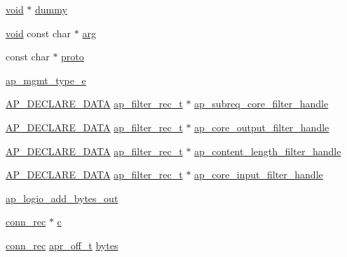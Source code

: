 \begin{DoxyCompactItemize}
\item 
\hyperlink{group__MOD__ISAPI_gacd6cdbf73df3d9eed42fa493d9b621a6}{void} $\ast$ \hyperlink{group__APACHE__CORE__HTTPD_ga99dc3b67257851cb91efea473083cd0f}{dummy}
\item 
\hyperlink{group__MOD__ISAPI_gacd6cdbf73df3d9eed42fa493d9b621a6}{void} const char $\ast$ \hyperlink{group__APACHE__CORE__HTTPD_gaf6517210150d97cd5cb8a17e3768770d}{arg}
\item 
const char $\ast$ \hyperlink{group__APACHE__CORE__HTTPD_ga1491042fd5b61bf39023b8df4c736128}{proto}
\item 
\hyperlink{group__APACHE__CORE__HTTPD_gaaf55dd27b182eda12b11c0694f78aae7}{ap\+\_\+mgmt\+\_\+type\+\_\+e}
\item 
\hyperlink{ap__config_8h_a0bb4c3adf74510a0dcdad5b125725fe0}{A\+P\+\_\+\+D\+E\+C\+L\+A\+R\+E\+\_\+\+D\+A\+TA} \hyperlink{structap__filter__rec__t}{ap\+\_\+filter\+\_\+rec\+\_\+t} $\ast$ \hyperlink{group__APACHE__CORE__HTTPD_ga3845515345618ae5adba5cf543a6ca60}{ap\+\_\+subreq\+\_\+core\+\_\+filter\+\_\+handle}
\item 
\hyperlink{ap__config_8h_a0bb4c3adf74510a0dcdad5b125725fe0}{A\+P\+\_\+\+D\+E\+C\+L\+A\+R\+E\+\_\+\+D\+A\+TA} \hyperlink{structap__filter__rec__t}{ap\+\_\+filter\+\_\+rec\+\_\+t} $\ast$ \hyperlink{group__APACHE__CORE__HTTPD_ga7a65162f73e91219aab6b19e042f1955}{ap\+\_\+core\+\_\+output\+\_\+filter\+\_\+handle}
\item 
\hyperlink{ap__config_8h_a0bb4c3adf74510a0dcdad5b125725fe0}{A\+P\+\_\+\+D\+E\+C\+L\+A\+R\+E\+\_\+\+D\+A\+TA} \hyperlink{structap__filter__rec__t}{ap\+\_\+filter\+\_\+rec\+\_\+t} $\ast$ \hyperlink{group__APACHE__CORE__HTTPD_ga56735a3038d1c625566a3d2faedbe500}{ap\+\_\+content\+\_\+length\+\_\+filter\+\_\+handle}
\item 
\hyperlink{ap__config_8h_a0bb4c3adf74510a0dcdad5b125725fe0}{A\+P\+\_\+\+D\+E\+C\+L\+A\+R\+E\+\_\+\+D\+A\+TA} \hyperlink{structap__filter__rec__t}{ap\+\_\+filter\+\_\+rec\+\_\+t} $\ast$ \hyperlink{group__APACHE__CORE__HTTPD_ga05817ab694ce58575ac1371ed9f62ee5}{ap\+\_\+core\+\_\+input\+\_\+filter\+\_\+handle}
\item 
\hyperlink{group__APACHE__CORE__HTTPD_gad1d337086972f0a3acedbf68359fef78}{ap\+\_\+logio\+\_\+add\+\_\+bytes\+\_\+out}
\item 
\hyperlink{structconn__rec}{conn\+\_\+rec} $\ast$ \hyperlink{group__APACHE__CORE__HTTPD_ga7cce37ef8558e46f408cb4d0f555605b}{c}
\item 
\hyperlink{structconn__rec}{conn\+\_\+rec} \hyperlink{group__apr__platform_ga6938af9075cec15c88299109381aa984}{apr\+\_\+off\+\_\+t} \hyperlink{group__APACHE__CORE__HTTPD_ga393b167dab644f408202cbbcad070e6d}{bytes}

\end{DoxyCompactItemize}
